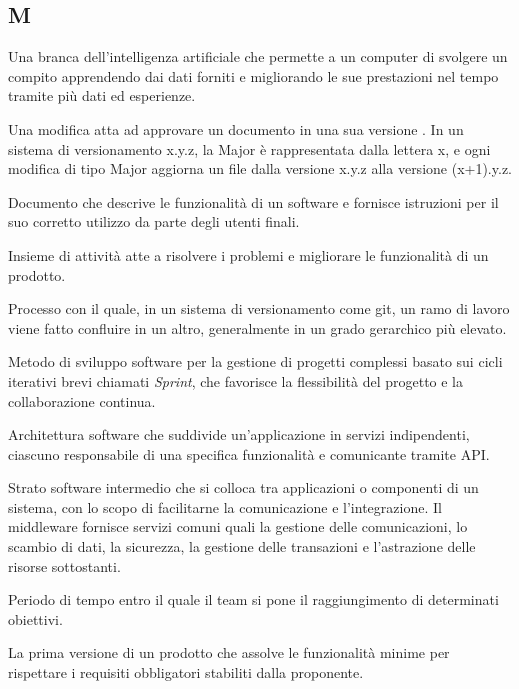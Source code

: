\begin{center}
\section*{M}
\end{center}

Una branca dell'intelligenza artificiale che permette a un computer di svolgere un compito apprendendo dai dati forniti e migliorando le sue prestazioni nel tempo tramite più dati ed esperienze.

Una modifica atta ad approvare un documento in una sua versione . In un sistema di versionamento x.y.z, la Major è rappresentata dalla lettera x, e ogni modifica di tipo Major aggiorna un file dalla versione x.y.z alla versione (x+1).y.z.

Documento che descrive le funzionalità di un software e fornisce istruzioni per il suo corretto utilizzo da parte degli utenti finali.

Insieme di attività atte a risolvere i problemi e migliorare le funzionalità di un prodotto.

Processo con il quale, in un sistema di versionamento come git, un ramo di lavoro viene fatto confluire in un altro, generalmente in un grado gerarchico più elevato.

Metodo di sviluppo software per la gestione di progetti complessi basato sui cicli iterativi brevi chiamati \textit{Sprint}, che favorisce la flessibilità del progetto e la collaborazione continua.

Architettura software che suddivide un’applicazione in servizi indipendenti, ciascuno responsabile di una specifica funzionalità e comunicante tramite API.

Strato software intermedio che si colloca tra applicazioni o componenti di un sistema, con lo scopo di facilitarne la comunicazione e l’integrazione. Il middleware fornisce servizi comuni quali la gestione delle comunicazioni, lo scambio di dati, la sicurezza, la gestione delle transazioni e l’astrazione delle risorse sottostanti.

Periodo di tempo entro il quale il team si pone il raggiungimento di determinati obiettivi.

La prima versione di un prodotto che assolve le funzionalità minime per rispettare i requisiti obbligatori stabiliti dalla proponente.

